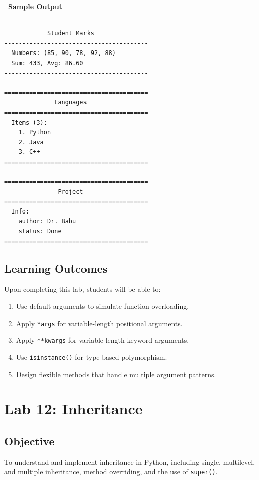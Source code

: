 \documentclass[12pt,a4paper]{article}
\newcommand{\outhead}{\noindent\colorbox{cmrgreen!25}%
  {\textbf{\small\color{cmrdark}~Sample Output~}}\par\vspace{-1pt}}
\begin{document}
\outhead
\begin{lstlisting}[style=outputstyle]
----------------------------------------
            Student Marks
----------------------------------------
  Numbers: (85, 90, 78, 92, 88)
  Sum: 433, Avg: 86.60
----------------------------------------

========================================
              Languages
========================================
  Items (3):
    1. Python
    2. Java
    3. C++
========================================

========================================
               Project
========================================
  Info:
    author: Dr. Babu
    status: Done
========================================
\end{lstlisting}

\subsection{Learning Outcomes}
Upon completing this lab, students will be able to:
\begin{enumerate}
  \item Use default arguments to simulate function overloading.
  \item Apply \texttt{*args} for variable-length positional arguments.
  \item Apply \texttt{**kwargs} for variable-length keyword arguments.
  \item Use \texttt{isinstance()} for type-based polymorphism.
  \item Design flexible methods that handle multiple argument patterns.
\end{enumerate}

\newpage

\section{Lab 12: Inheritance}

\subsection{Objective}
To understand and implement inheritance in Python, including single, multilevel, and multiple inheritance, method overriding, and the use of \texttt{super()}.
\end{document}
